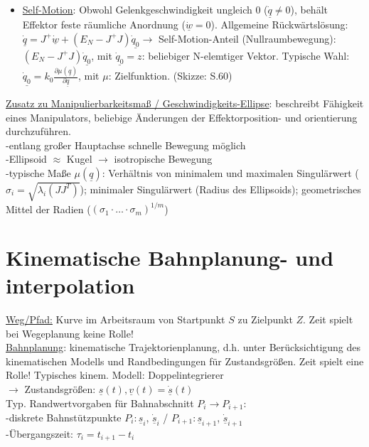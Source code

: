 \documentclass[a4paper,landscape,6pt]{article}
\newcommand{\ul}[1]{\underline{#1}}
\begin{document}
\begin{multicols}{3}
\begin{itemize}
	\item \ul{Self-Motion}: Obwohl Gelenkgeschwindigkeit ungleich 0 ($\ul{\dot q} \ne 0$), behält Effektor feste räumliche Anordnung ($\ul{\dot w} = 0$). Allgemeine Rückwärtslösung: $\ul{\dot q} = J^+ \ul{\dot w} + (E_N - J^+ J)\ul{\dot q_0} \rightarrow$ Self-Motion-Anteil (Nullraumbewegung): $(E_N - J^+ J)\ul{\dot q_0}$, mit $\ul{\dot q_0} = z$: beliebiger N-elemtiger Vektor. Typische Wahl: $\ul{\dot q_0}=k_0 \frac{\partial \mu (\ul q)}{\partial \ul q}$, mit $\mu$: Zielfunktion. (Skizze: S.60)
\end{itemize}
\ul{Zusatz zu Manipulierbarkeitsmaß / Geschwindigkeits-Ellipse}: beschreibt Fähigkeit eines Manipulators, beliebige Änderungen der Effektorposition- und orientierung durchzuführen.\\
-entlang großer Hauptachse schnelle Bewegung möglich\\
-Ellipsoid $\approx$ Kugel $\rightarrow$ isotropische Bewegung\\
-typische Maße $\mu(\ul q)$: Verhältnis von minimalem und maximalen Singulärwert ($\sigma_i = \sqrt{\lambda_i(JJ^T)}$); minimaler Singulärwert (Radius des Ellipsoids); geometrisches Mittel der Radien ($(\sigma_1\cdot\dots\cdot\sigma_m)^{1/m}$)
\newpage
\section{Kinematische Bahnplanung- und interpolation}
\ul{Weg/Pfad:} Kurve im Arbeitsraum von Startpunkt $S$ zu Zielpunkt $Z$. Zeit spielt bei Wegeplanung keine Rolle!\\
\ul{Bahnplanung}: kinematische Trajektorienplanung, d.h. unter Berücksichtigung des kinematischen Modells und Randbedingungen für Zustandsgrößen. Zeit spielt eine Rolle!
Typisches kinem. Modell: Doppelintegrierer \\ $\rightarrow$ Zustandsgrößen: $\ul s(t), \ul v(t) = \ul {\dot s}(t)$\\
Typ. Randwertvorgaben für Bahnabschnitt $P_i \rightarrow P_{i+1}$:\\
-diskrete Bahnstützpunkte $P_i: \ul s_i$, $ \ul{\dot s}_i$ / $P_{i+1}: \ul s_{i+1}$, $\ul{\dot s}_{i+1}$\\
-Übergangszeit: $\tau_i = t_{i+1} - t_i$

\end{multicols}
\end{document}
